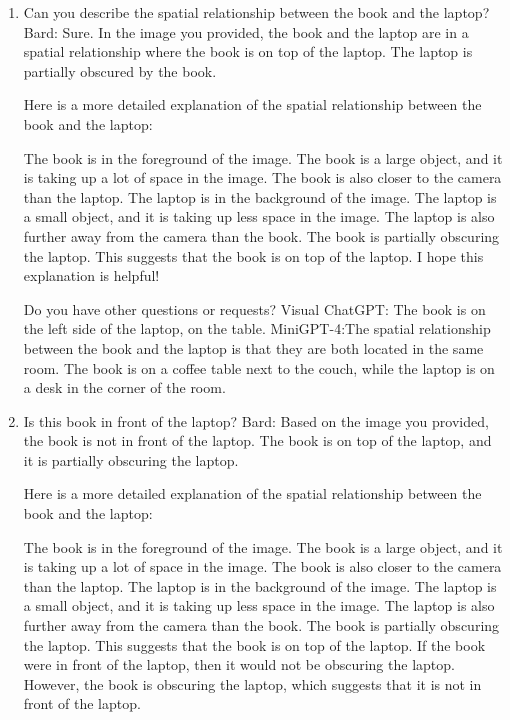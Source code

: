 \begin{enumerate}
    \item Can you describe the spatial relationship between the book and the laptop?
    \subitem Bard:
    Sure. In the image you provided, the book and the laptop are in a spatial relationship where the book is on top of the laptop. The laptop is partially obscured by the book.
    
    Here is a more detailed explanation of the spatial relationship between the book and the laptop:
    
    The book is in the foreground of the image. The book is a large object, and it is taking up a lot of space in the image. The book is also closer to the camera than the laptop.
    The laptop is in the background of the image. The laptop is a small object, and it is taking up less space in the image. The laptop is also further away from the camera than the book.
    The book is partially obscuring the laptop. This suggests that the book is on top of the laptop.
    I hope this explanation is helpful!
    
    Do you have other questions or requests?
    \subitem Visual ChatGPT: The book is on the left side of the laptop, on the table.
    \subitem MiniGPT-4:The spatial relationship between the book and the laptop is that they are both located in the same room. The book is on a coffee table next to the couch, while the laptop is on a desk in the corner of the room. 
    \item Is this book in front of the laptop?
    \subitem Bard: 
    Based on the image you provided, the book is not in front of the laptop. The book is on top of the laptop, and it is partially obscuring the laptop.
    
    Here is a more detailed explanation of the spatial relationship between the book and the laptop:
    
    The book is in the foreground of the image. The book is a large object, and it is taking up a lot of space in the image. The book is also closer to the camera than the laptop.
    The laptop is in the background of the image. The laptop is a small object, and it is taking up less space in the image. The laptop is also further away from the camera than the book.
    The book is partially obscuring the laptop. This suggests that the book is on top of the laptop.
    If the book were in front of the laptop, then it would not be obscuring the laptop. However, the book is obscuring the laptop, which suggests that it is not in front of the laptop.
    

\end{enumerate}
